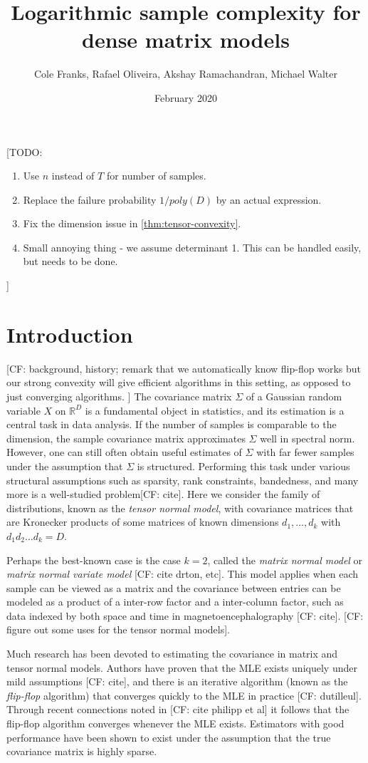 \documentclass{article}
\title{Logarithmic sample complexity for dense matrix models}
\author{Cole Franks, Rafael Oliveira, Akshay Ramachandran, Michael Walter}
\date{February 2020}
\newcommand{\R}{{\mathbb{R}}}
\newcommand{\CF}[1]{{\color{purple}[CF: #1]}}
\newcommand{\TODO}[1]{{\color{blue}[TODO: #1]}}
\begin{document}
\maketitle
\tableofcontents
\TODO{
\begin{enumerate}
\item Use $n$ instead of $T$ for number of samples.
\item Replace the failure probability $1/poly(D)$ by an actual expression.
\item Fix the dimension issue in \cref{thm:tensor-convexity}.
\item Small annoying thing - we assume determinant 1. This can be handled easily, but needs to be done.
\end{enumerate}

}


\section{Introduction}
\CF{background, history; remark that we automatically know flip-flop works but our strong convexity will give efficient algorithms in this setting, as opposed to just converging algorithms. }
The covariance matrix $\Sigma$ of a Gaussian random variable $X$ on $\R^D$ is a fundamental object in statistics, and its estimation is a central task in data analysis. If the number of samples is comparable to the dimension, the sample covariance matrix approximates $\Sigma$ well in spectral norm. However, one can still often obtain useful estimates of $\Sigma$ with far fewer samples under the assumption that $\Sigma$ is structured. Performing this task under various structural assumptions such as sparsity, rank constraints, bandedness, and many more is a well-studied problem\CF{cite}. Here we consider the family of distributions, known as the \emph{tensor normal model}, with covariance matrices that are Kronecker products of some matrices of known dimensions $d_1, \dots, d_k$ with $d_1d_2\dots d_k = D$.

Perhaps the best-known case is the case $k = 2$, called the \emph{matrix normal model} or  \emph{matrix normal variate model} \CF{cite drton, etc}. This model applies when each sample can be viewed as a matrix and the covariance between entries can be modeled as a product of a inter-row factor and a inter-column factor, such as data indexed by both space and time in magnetoencephalography \CF{cite}. \CF{figure out some uses for the tensor normal models}.

Much research has been devoted to estimating the covariance in matrix and tensor normal models. Authors have proven that the MLE exists uniquely under mild assumptions \CF{cite}, and there is an iterative algorithm (known as the \emph{flip-flop} algorithm) that converges quickly to the MLE in practice \CF{dutilleul}. Through recent connections noted in \CF{cite philipp et al} it follows that the flip-flop algorithm converges whenever the MLE exists. Estimators with good performance have been shown to exist under the assumption that the true covariance matrix is highly sparse.
\end{document}
